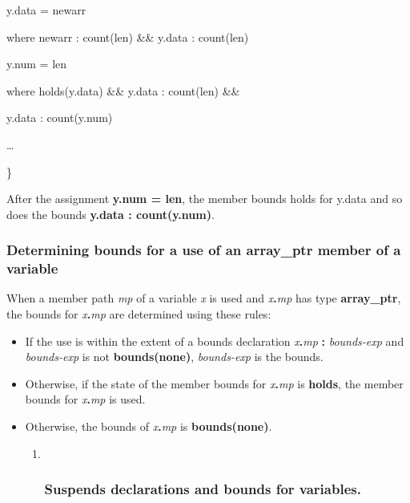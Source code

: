 \documentclass[]{article}
\begin{document}
y.data = newarr

where newarr : count(len) \&\& y.data : count(len)

y.num = len

where holds(y.data) \&\& y.data : count(len) \&\&

y.data : count(y.num)

\ldots{}

\}

After the assignment \textbf{y.num = len}, the member bounds holds for
y.data and so does the bounds \textbf{y.data : count(y.num)}.

\subsubsection{\texorpdfstring{\protect\hypertarget{ux5fRef435525127}{}{\protect\hypertarget{ux5fToc437460812}{}{\protect\hypertarget{ux5fToc440445493}{}{\protect\hypertarget{ux5fToc440449275}{}{\protect\hypertarget{ux5fToc440551925}{}{}}}}}Determining
bounds for a use of an array\_ptr member of a
variable}{Determining bounds for a use of an array\_ptr member of a variable}}\label{determining-bounds-for-a-use-of-an-arrayux5fptr-member-of-a-variable}

When a member path \emph{mp} of a variable \emph{x} is used and
\emph{x}\textbf{.}\emph{mp} has type \textbf{array\_ptr}, the bounds for
\emph{x}\textbf{.}\emph{mp} are determined using these rules:

\begin{itemize}
\item
  If the use is within the extent of a bounds declaration
  \emph{x}\textbf{.}\emph{mp} \textbf{:} \emph{bounds-exp} and
  \emph{bounds-exp} is not \textbf{bounds(none)}, \emph{bounds-exp} is
  the bounds.
\item
  Otherwise, if the state of the member bounds for
  \emph{x}\textbf{.}\emph{mp} is \textbf{holds}, the member bounds for
  \emph{x}\textbf{.}\emph{mp} is used.
\item
  Otherwise, the bounds of \emph{x}\textbf{.}\emph{mp} is
  \textbf{bounds(none)}.

  \begin{enumerate}
  \def\labelenumi{\arabic{enumi}.}
  \item ~
    \subsubsection{\texorpdfstring{\protect\hypertarget{ux5fToc437460813}{}{\protect\hypertarget{ux5fToc440445494}{}{\protect\hypertarget{ux5fToc440449276}{}{\protect\hypertarget{ux5fToc440551926}{}{}}}}Suspends
    declarations and bounds for
    variables.}{Suspends declarations and bounds for variables.}}\label{suspends-declarations-and-bounds-for-variables.}
  \end{enumerate}
\end{itemize}
\end{document}
